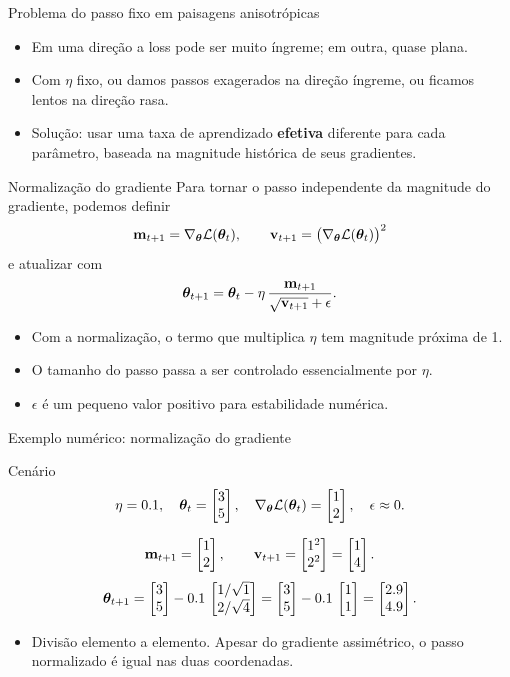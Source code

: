 \documentclass[aspectratio=169,xcolor=dvipsnames]{beamer}
\begin{document}
  \begin{frame}{Problema do passo fixo em paisagens anisotrópicas}
    \begin{itemize}
      \item Em uma direção a loss pode ser muito íngreme; em outra, quase plana.
      \item Com $\eta$ fixo, ou damos passos exagerados na direção íngreme, ou ficamos
        lentos na direção rasa.
      \item Solução: usar uma taxa de aprendizado \textbf{efetiva} diferente para cada
        parâmetro, baseada na magnitude histórica de seus gradientes.
    \end{itemize}
  \end{frame}

  \begin{frame}{Normalização do gradiente}
    Para tornar o passo independente da magnitude do gradiente, podemos definir
    \[
      \mathbf{m}_{t+1}=\nabla_{\bm{\theta}}\mathcal{L}(\bm{\theta}_t),\qquad
      \mathbf{v}_{t+1}=\big(\nabla_{\bm{\theta}}\mathcal{L}(\bm{\theta}_t)\big)^{2}
    \]
    e atualizar com
    \[
      \bm{\theta}_{t+1}=\bm{\theta}_{t}-\eta\,\frac{\mathbf{m}_{t+1}}{\sqrt{\mathbf{v}_{t+1}}+\epsilon}.
    \]
    \begin{itemize}
      \item Com a normalização, o termo que multiplica $\eta$ tem magnitude próxima de 1.
      \item O tamanho do passo passa a ser controlado essencialmente por $\eta$.
      \item $\epsilon$ é um pequeno valor positivo para estabilidade numérica.
    \end{itemize}
  \end{frame}

  \begin{frame}{Exemplo numérico: normalização do gradiente}
    \begin{block}{Cenário}
      \[
        \eta=0.1,\quad \bm{\theta}_t=\begin{bmatrix} 3 \\ 5 \end{bmatrix},\quad \nabla_{\bm{\theta}}\mathcal{L}(\bm{\theta}_t)=\begin{bmatrix} 1 \\ 2 \end{bmatrix},\quad \epsilon\approx 0.
      \]
    \end{block}
    \[
      \mathbf{m}_{t+1} = \begin{bmatrix} 1 \\ 2 \end{bmatrix},\qquad \mathbf{v}_{t+1} = \begin{bmatrix} 1^2 \\ 2^2 \end{bmatrix} = \begin{bmatrix} 1 \\ 4 \end{bmatrix}.
    \]
    \[
      \bm{\theta}_{t+1} = \begin{bmatrix} 3 \\ 5 \end{bmatrix} - 0.1\,\begin{bmatrix} 1/\sqrt{1} \\ 2/\sqrt{4} \end{bmatrix}
      = \begin{bmatrix} 3 \\ 5 \end{bmatrix} - 0.1\,\begin{bmatrix} 1 \\ 1 \end{bmatrix} = \begin{bmatrix} 2.9 \\ 4.9 \end{bmatrix}.
    \]
    \begin{itemize}
      \item Divisão elemento a elemento. Apesar do gradiente assimétrico, o passo normalizado é igual nas duas coordenadas.
    \end{itemize}
  \end{frame}
\end{document}

